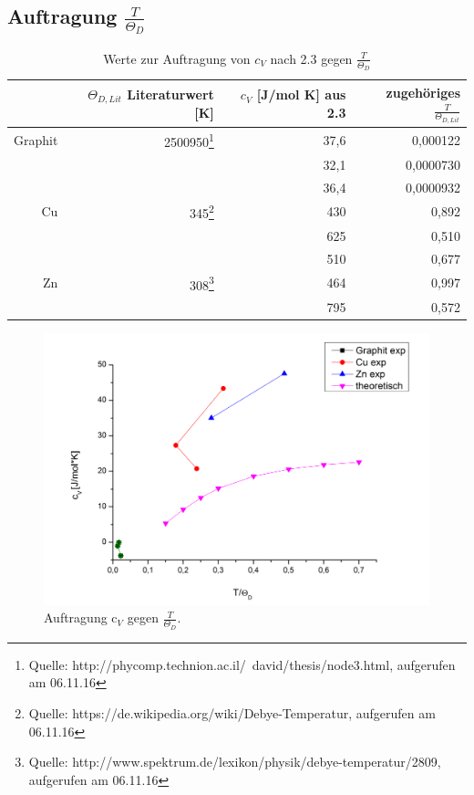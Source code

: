 \documentclass[12pt,a4paper,titlepage,headinclude,bibtotoc]{scrartcl}
\begin{document}
\subsection{Auftragung $\frac{T}{\Theta_D}$}

\begin{table} [h]
\centering
\caption{Werte zur Auftragung von $c_V$ nach 2.3 gegen $\frac{T}{\Theta_D}$}
\begin{tabular} {r | r |r | r }
&$\Theta_{D,Lit}$ Literaturwert [K] &$c_V$ [J/mol K] aus 2.3& zugehöriges $\frac{T}{\Theta_{D,Lit}}$ \\
\hline
Graphit& 2500950\protect\footnote{Quelle: http://phycomp.technion.ac.il/~david/thesis/node3.html, aufgerufen am 06.11.16} &37,6&0,000122 \\
&&32,1& 0,0000730 \\
&&36,4& 0,0000932 \\
Cu&345\protect\footnote{Quelle: https://de.wikipedia.org/wiki/Debye-Temperatur, aufgerufen am 06.11.16} &430& 0,892 \\
&&625& 0,510\\
&&510& 0,677\\
Zn&308\protect\footnote{Quelle: http://www.spektrum.de/lexikon/physik/debye-temperatur/2809, aufgerufen am 06.11.16} &464& 0,997\\
&&795& 0,572\\
\end{tabular}
\end{table}

\begin{figure}
\includegraphics[width=13.5cm]{Auswertung7.png}
\caption{Auftragung $\text{c}_V$ gegen $\frac{T}{\Theta_D}$.}
\end{figure}
\FloatBarrier
\end{document}
